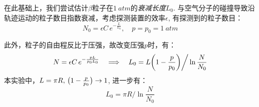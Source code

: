 \documentclass[aps,pre,12pt,preprint,%
	onecolumn,showpacs,showkeys,nofootinbib]{revtex4-1}
\begin{document}
	在此基础上，我们尝试估计$\beta$粒子在$\SI{1}{atm}$的\textit{衰减长度}$L_0$. 与空气分子的碰撞导致沿轨迹运动的粒子数目指数衰减，考虑探测装置的效率$\epsilon$, 有探测到的粒子数目：
	\begin{equation}
		N_0 = \epsilon C\,e^{-\frac{L}{L_0}},\quad
		p = p_0 = \SI{1}{atm}
	\end{equation}
	
	此外，粒子的自由程反比于压强，故改变压强$p$时，有：
	\begin{equation}
		N = \epsilon C\,e^{-\frac{pL}{p_0 L_0}}\quad
		\Longrightarrow\quad
		L_0 = L\pqty{1 - \frac{p}{p_0}} \bigg/ \ln\frac{N}{N_0}
	\end{equation}
	本实验中，$L = \pi R,\,\pqty\big{1 - \frac{p}{p_0}} \to 1$, 进一步有：
	\begin{equation}
		L_0 = \pi R \bigg/ \ln\frac{N}{N_0}
	\end{equation}
	
\end{document}
